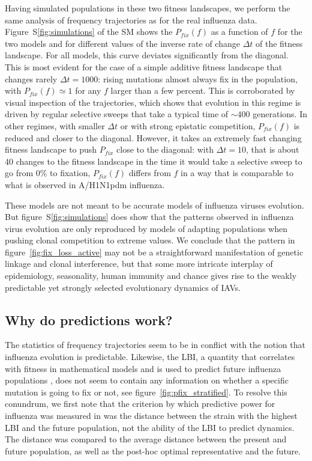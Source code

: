 \documentclass[reprint,amsmath,amssymb,superscriptaddress,showpacs,rmp]{revtex4-1}
\newcommand{\sref}[1]{S\ref{#1}}
\begin{document}
Having simulated populations in these two fitness landscapes, we perform the same analysis of frequency trajectories as for the real influenza data.
Figure~\sref{fig:simulations} of the SM shows the $P_{fix}(f)$ as a function of $f$ for the two models and for different values of the inverse rate of change $\Delta t$ of the fitness landscape.
For all models, this curve deviates significantly from the diagonal.
This is most evident for the case of a simple additive fitness landscape that changes rarely $\Delta t=1000$: rising mutations almost always fix in the population, with $P_{fix}(f)\simeq 1$ for any $f$ larger than a few percent.
This is corroborated by visual inspection of the trajectories, which shows that evolution in this regime is driven by regular selective sweeps that take a typical time of $\sim 400$ generations.
In other regimes, with smaller $\Delta t$ or with strong epistatic competition, $P_{fix}(f)$ is reduced and closer to the diagonal.
However, it takes an extremely fast changing fitness landscape to push $P_{fix}$ close to the diagonal: with $\Delta t=10$, that is about 40 changes to the fitness landscape in the time it would take a selective sweep to go from 0\% to fixation, $P_{fix}(f)$ differs from $f$ in a way that is comparable to what is observed in A/H1N1pdm influenza.

These models are not meant to be accurate models of influenza viruses evolution.
But figure~\sref{fig:simulations} does show that the patterns observed in influenza virus evolution are only reproduced by models of adapting populations when pushing clonal competition to extreme values.
We conclude that the pattern in figure~\ref{fig:fix_loss_active} may not be a straightforward manifestation of genetic linkage and clonal interference, but that some more intricate interplay of epidemiology, seasonality, human immunity and chance gives rise to the weakly predictable yet strongly selected evolutionary dynamics of IAVs.

\subsection*{Why do predictions work?}
The statistics of frequency trajectories seem to be in conflict with the notion that influenza evolution is predictable.
Likewise, the LBI, a quantity that correlates with fitness in mathematical models and is used to predict future influenza populations \citep{neher_predicting_2014}, does not seem to contain any information on whether a specific mutation is going to fix or not, see figure~\ref{fig:pfix_stratified}.
To resolve this conundrum, we first note that the criterion by which predictive power for influenza was measured in \citep{neher_predicting_2014} was the distance between the strain with the highest LBI and the future population, not the ability of the LBI to predict dynamics.
The distance was compared to the average distance between the present and future population, as well as the post-hoc optimal representative and the future.
\end{document}
